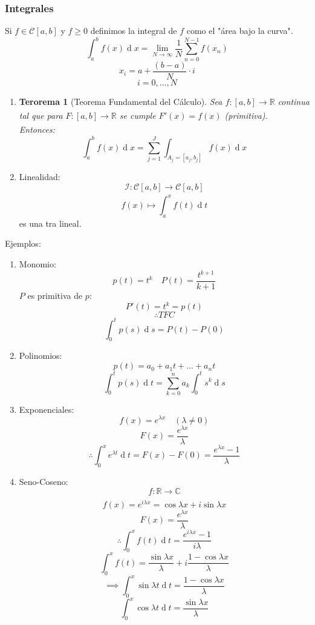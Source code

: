 \documentclass[11pt]{book}
\renewcommand{\d}[1]{\ensuremath{\operatorname{d}\!{#1}}}
\newcommand{\set}[1]{\mathbb{#1}}
\newcommand{\func}[5]{#1:#2\xrightarrow[#5]{#4}#3}
\newtheorem{thm}{Terorema}[section]
\theoremstyle{definition}
\begin{document}
\subsubsection{Integrales}
Si $f\in\mathcal{C}[a,b]$ y $f\geq 0$ definimos la integral de $f$ como el "área bajo la curva".
\[\int^b_a f(x)\d{x}=\lim_{N\rightarrow\infty}\frac{1}{N}\sum^{N-1}_{n=0}f(x_n)\]
\[x_i=a+\frac{(b-a)}{N}\cdot i\]
\[i=0,...,N\]
\begin{enumerate}
	\item \begin{thm}[Teorema Fundamental del Cálculo]
		Sea $\func{f}{[a,b]}{\set{R}}{}{}$ continua tal que para $\func{F}{[a,b]}{\set{R}}{}{}$ se cumple $F'(x)=f(x)$ (primitiva).\\
		Entonces:
		\[\int^b_a f(x)\d{x}=\sum^J_{j=1}\int_{A_j=[a_j,b_j]}f(x)\d{x}\]
	\end{thm}

	\item Linealidad:
	\[\func{\mathcal{I}}{\mathcal{C}[a,b]}{\mathcal{C}[a,b]}{}{}\]
	\[f(x)\mapsto\int^x_af(t)\d{t}\]
	es una tra lineal.
\end{enumerate}
Ejemplos:
\begin{enumerate}
	\item Monomio:
	\[p(t)=t^k\quad P(t)=\frac{t^{k+1}}{k+1}\]
	$P$ es primitiva de $p$:
	\[P'(t)=t^k=p(t)\]
	\[\therefore TFC\]
	\[\int^t_0p(s)\d{s}=P(t)-P(0)\]

	\item Polinomios:
	\[p(t)=a_0+a_1t+...+a_nt\]
	\[\int^t_0p(s)\d{t}=\sum^n_{k=0}a_k\int^t_0s^k\d{s}\]

	\item Exponenciales:
	\[f(x)=e^{\lambda x}\quad(\lambda\neq 0)\]
	\[F(x)=\frac{e^{\lambda x}}{\lambda}\]
	\[\therefore \int^x_0e^{\lambda t}\d{t}=F(x)-F(0)=\frac{e^{\lambda x}-1}{\lambda}\]
	
	\item Seno-Coseno:
	\[\func{f}{\set{R}}{\set{C}}{}{}\]
	\[f(x)=e^{i\lambda x}=\cos\lambda x+i\sin\lambda x\]
	\[F(x)=\frac{e^{\lambda x}}{\lambda}\]
	\[\therefore\int^x_0f(t)\d{t}=\frac{e^{i\lambda x}-1}{i\lambda}\]
	\[\int^x_0f(t)=\frac{\sin \lambda x}{\lambda}+i\frac{1-\cos \lambda x}{\lambda}\]
	\[\implies \int^x_0\sin\lambda t\d{t}=\frac{1-\cos \lambda x}{\lambda}\]
	\[\int^x_0\cos\lambda t\d{t}=\frac{\sin \lambda x}{\lambda}\]
\end{enumerate}
\end{document}
